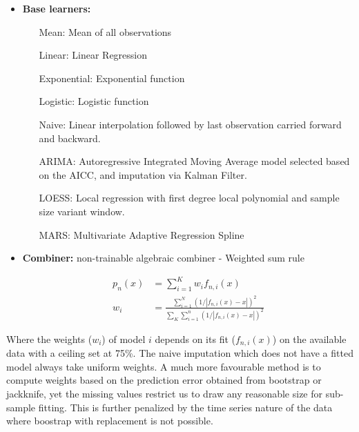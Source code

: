 \documentclass[nojss]{jss}\usepackage[]{graphicx}\usepackage[]{color}
\begin{document}
\begin{itemize}
  \item {\textbf{Base learners:}}
    \begin{itemize}
      \setlength{\leftmargini}{5em}
      \item[Mean:] Mean of all observations
      \item [Linear:] Linear Regression
      \item [Exponential:] Exponential function
      \item [Logistic:] Logistic function        
      \item [Naive:] Linear interpolation followed by last observation
        carried forward and backward.
      \item [ARIMA:] Autoregressive Integrated Moving Average model
        selected based on the AICC, and imputation via Kalman Filter.
      \item [LOESS:] Local regression with first degree local
        polynomial and sample size variant window.
      \item [MARS:] Multivariate Adaptive Regression Spline
    \end{itemize}
  \item {\textbf{Combiner:}}
    non-trainable algebraic combiner - Weighted sum rule

    \begin{align}
      p_n(x) &= \sum_{i=1}^K w_i f_{n, i}(x) \nonumber \\
      w_i &= \frac{\sum_{i = 1}^N(1/|f_{n, i}(x) - x|)^2}{\sum_{K}\sum_{i=1}^n(1/|f_{n, i}(x) - x|)^2}\nonumber
    \end{align}
    
    
\end{itemize}

Where the weights ($w_i$) of model $i$ depends on its fit ($f_{n,
  i}(x)$) on the available data with a ceiling set at 75\%. The naive
imputation which does not have a fitted model always take uniform
weights. A much more favourable method is to compute weights based on
the prediction error obtained from bootstrap or jackknife, yet the
missing values restrict us to draw any reasonable size for sub-sample
fitting. This is further penalized by the time series nature of the
data where boostrap with replacement is not possible.\\
\end{document}
